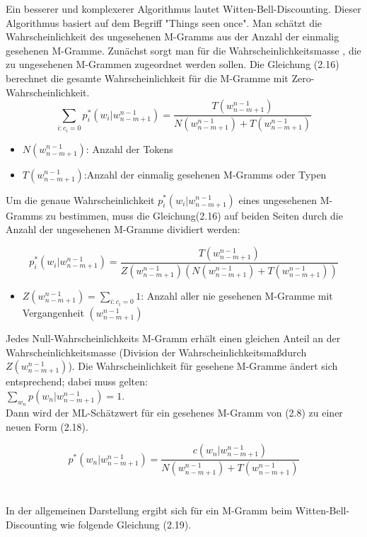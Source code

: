 Ein besserer und komplexerer Algorithmus lautet Witten-Bell-Discounting.
Dieser Algorithmus basiert auf dem Begriff "Things seen once". Man sch\"atzt die Wahrscheinlichkeit des ungesehenen M-Gramms aus der Anzahl der einmalig gesehenen M-Gramme. Zun\"achst sorgt man f\"ur die Wahrscheinlichkeitsmasse , die zu ungesehenen M-Grammen zugeordnet werden sollen. Die Gleichung (2.16) berechnet die  gesamte Wahrscheinlichkeit f\"ur  die M-Gramme mit Zero-Wahrscheinlichkeit.
\begin{equation}
\label{equation:witten_bell_01}
\sum_{i:c_{i}=0}p_{i}^{*}(w_{i}|w_{n-m+1}^{n-1})=\frac{T(w_{n-m+1}^{n-1})}{N(w_{n-m+1}^{n-1})+T(w_{n-m+1}^{n-1})}
\end{equation}
\begin{itemize}
	\item $N(w_{n-m+1}^{n-1})$: Anzahl der Tokens\\
	\item $T(w_{n-m+1}^{n-1})$:Anzahl der einmalig gesehenen M-Gramms oder Typen
\end{itemize}
Um die genaue Wahrscheinlichkeit $p_{i}^{*}(w_{i}|w_{n-m+1}^{n-1})$ eines ungesehenen M-Gramms zu bestimmen, muss die Gleichung(2.16) auf beiden Seiten durch die Anzahl der ungesehenen M-Gramme dividiert werden:

\begin{equation}
\label{equation:witten_bell_02}
p_{i}^{*}(w_{i}|w_{n-m+1}^{n-1})=\frac{T(w_{n-m+1}^{n-1})}{Z(w_{n-m+1}^{n-1})(N(w_{n-m+1}^{n-1})+T(w_{n-m+1}^{n-1}))}
\end{equation}
\begin{itemize}
	\item $Z(w_{n-m+1}^{n-1})=\sum_{i:c_{i}=0}1$: Anzahl aller nie gesehenen M-Gramme mit Vergangenheit $(w_{n-m+1}^{n-1})$
\end{itemize}
Jedes Null-Wahrscheinlichkeits M-Gramm erh\"alt einen gleichen Anteil an der Wahrscheinlichkeitsmasse (Division der Wahrscheinlichkeitsma\ss durch $Z(w_{n-m+1}^{n-1})$).
Die Wahrscheinlichkeit f\"ur gesehene M-Gramme \"andert sich entsprechend; dabei muss gelten:\\ 
$\sum_{w_{n}}p(w_{n}|w_{n-m+1}^{n-1})=1$.\\
Dann wird der ML-Sch\"atzwert  f\"ur ein gesehenes M-Gramm von (2.8) zu einer neuen Form (2.18). 

\begin{equation}
\label{equation:witten_bell_03}
p^{*}(w_{n}|w_{n-m+1}^{n-1})=\frac{c(w_{n}|w_{n-m+1}^{n-1})}{N(w_{n-m+1}^{n-1})+T(w_{n-m+1}^{n-1})}
\end{equation}
\\
\\
In der allgemeinen Darstellung ergibt sich f\"ur ein M-Gramm  beim Witten-Bell-Discounting wie folgende Gleichung (2.19).

